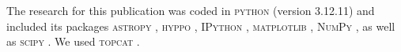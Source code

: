 \documentclass[fleqn,usenatbib]{mnras}
\begin{document}
The research for this publication was coded in \textsc{python} (version 3.12.11) and included its packages
\textsc{astropy} \citep[v. 7.1.0;][]{Robitaille2013,PriceWhelan2018},
\textsc{hyppo} \citep[v. 0.5.2;][]{hyppo},
\textsc{IPython} \citep[v. 9.1.0;][]{ipython},
\textsc{matplotlib} \citep[v. 3.10.3;][]{matplotlib},
\textsc{NumPy} \citep[v. 2.2.6;][]{numpy}, as well as
\textsc{scipy} \citep[v. 1.16.0;][]{Scipy}.
We used \textsc{topcat} \citep[v. 4.7;][]{Taylor2005}.





\label{lastpage}
\end{document}

